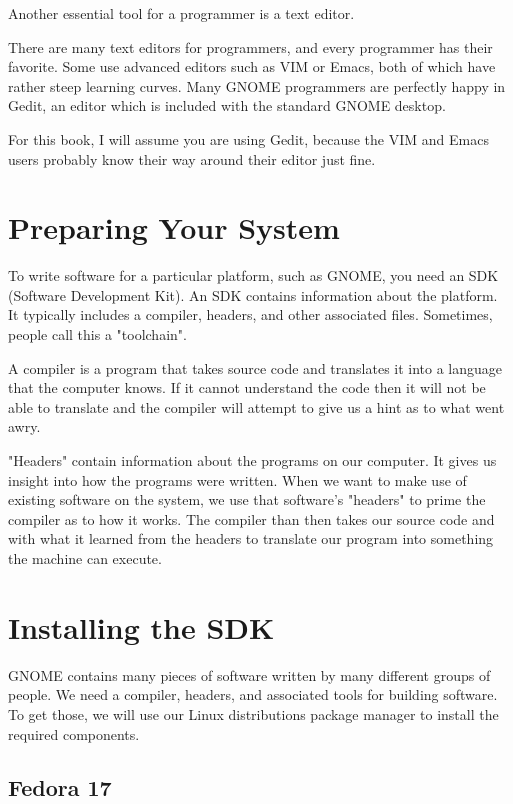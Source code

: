 Another essential tool for a programmer is a text editor.

There are many text editors for programmers, and every programmer has their
favorite. Some use advanced editors such as VIM or Emacs, both of which have
rather steep learning curves. Many GNOME programmers are perfectly happy in 
Gedit, an editor which is included with the standard GNOME desktop. 

For this book, I will assume you are using Gedit, because the VIM and Emacs
users probably know their way around their editor just fine.

\section{Preparing Your System}

To write software for a particular platform, such as GNOME, you need an SDK
(Software Development Kit). An SDK contains information about the platform. It
typically includes a compiler, headers, and other associated files. Sometimes,
people call this a "toolchain".

A compiler is a program that takes source code and translates it into a
language that the computer knows. If it cannot understand the code then it will
not be able to translate and the compiler will attempt to give us a hint as to
what went awry.

"Headers" contain information about the programs on our computer.  It gives us
insight into how the programs were written. When we want to make use of
existing software on the system, we use that software's "headers" to prime the
compiler as to how it works. The compiler than then takes our source code and
with what it learned from the headers to translate our program into something
the machine can execute.


\section{Installing the SDK}

GNOME contains many pieces of software written by many different groups of
people. We need a compiler, headers, and associated tools for building
software. To get those, we will use our Linux distributions package manager to
install the required components.


\subsection{Fedora 17}

